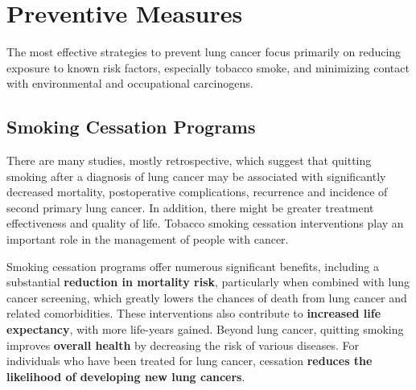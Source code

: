 \section{Preventive Measures}

The most effective strategies to prevent lung cancer focus primarily on reducing exposure to known 
risk factors, especially tobacco smoke, and minimizing contact with environmental and occupational 
carcinogens.

\subsection{Smoking Cessation Programs}

There are many studies, mostly retrospective, which suggest that quitting smoking after a diagnosis 
of lung cancer may be associated with significantly decreased mortality\cite{20093278}, 
postoperative complications, recurrence and incidence of second primary lung cancer. In addition, 
there might be greater treatment effectiveness and quality of life\cite{22244802}. Tobacco smoking 
cessation interventions play an important role in the management of people with cancer.

Smoking cessation programs offer numerous significant benefits, including a substantial 
\textbf{reduction in mortality risk}, particularly when combined with lung cancer screening, which 
greatly lowers the chances of death from lung cancer and related comorbidities. These interventions 
also contribute to \textbf{increased life expectancy}, with more life-years gained. Beyond lung 
cancer, quitting smoking improves \textbf{overall health} by decreasing the risk of various 
diseases. For individuals who have been treated for lung cancer, cessation \textbf{reduces the 
likelihood of developing new lung cancers}. 

